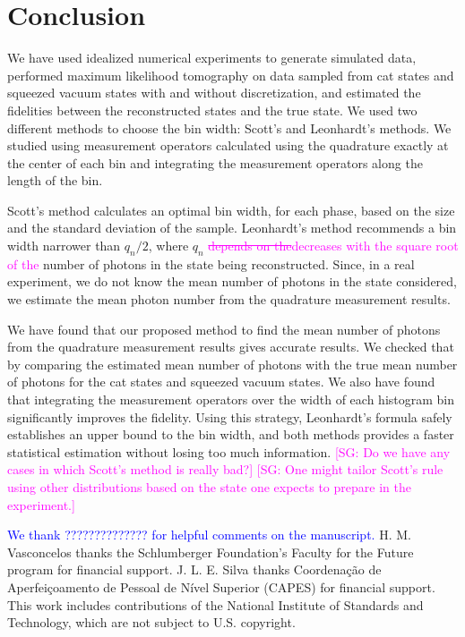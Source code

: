 \documentclass[
reprint,
superscriptaddress,
showpacs,
amsmath,
amssymb,
aps,
pra,
longbibliography
]{revtex4-1}
\providecommand{\aucmnt}[1]{#1}
\providecommand{\editcolor}[2]{\textcolor{#1}{#2}}
\providecommand{\aucmnt}[1]{}
\providecommand{\editcolor}[2]{#2}
\newcommand{\HV}[1]{\editcolor{blue}{#1}}
\newcommand{\SG}[1]{\editcolor{magenta}{#1}}
\newcommand{\SGs}[1]{\aucmnt{\editcolor{magenta}{\sout{#1}}}}
\newcommand{\SGc}[1]{\aucmnt{\editcolor{magenta}{[SG: #1]}}}
\begin{document}
\section{Conclusion}
\label{conclusion}

We have used idealized numerical experiments to generate simulated
data, performed maximum likelihood tomography on data sampled
from cat states and squeezed vacuum states with and without
discretization, and estimated the fidelities between
the reconstructed states and the true state. We used two different
methods to choose the bin width: Scott's and Leonhardt's methods. We
studied using measurement operators calculated using the
quadrature exactly at the center of each bin and integrating the
measurement operators along the length of the bin. 

Scott's method calculates an optimal bin width, for each phase, based
on the size and the standard deviation of the sample. Leonhardt's
method recommends a bin width narrower than $q_n/2$, where $q_n$
\SGs{depends on the}\SG{decreases with the square root of the} number
of photons in the state being reconstructed.  Since, in a real
experiment, we do not know the mean number of photons in the state
considered, we estimate the mean photon number from the quadrature
measurement results.

We have found that our proposed method to find the mean number of
photons from the quadrature measurement results gives accurate
results. We checked that by comparing the estimated mean number of
photons with the true mean number of photons for the cat states and
squeezed vacuum states. We also have found that integrating the
measurement operators over the width of each histogram bin
significantly improves the fidelity. Using this strategy, Leonhardt's
formula safely establishes an upper bound to the bin width, and both
methods provides a faster statistical estimation without losing too
much information.  \SGc{Do we have any cases in which Scott's method
  is really bad?}  \SGc{One might tailor Scott's rule using other
  distributions based on the state one expects to prepare in the
  experiment.}



\begin{acknowledgments}
  \HV{We thank ?????????????? for
    helpful comments on the manuscript.}  H. M. Vasconcelos thanks the
  Schlumberger Foundation's Faculty for the Future program for
  financial support. J. L. E. Silva thanks Coordena\c c\~ao de
  Aperfei\c coamento de Pessoal de N\'ivel Superior (CAPES) for
  financial support. This work includes contributions of the National
  Institute of Standards and Technology, which are not subject to
  U.S. copyright.
\end{acknowledgments}
\end{document}
